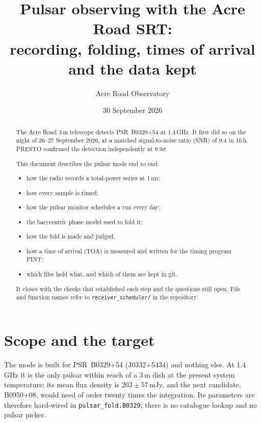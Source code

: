 \documentclass[11pt,a4paper]{article}
\title{Pulsar observing with the Acre Road SRT:\\
recording, folding, times of arrival and the data kept}
\author{Acre Road Observatory}
\date{30 September 2026}
\newcommand{\code}[1]{\texttt{#1}}
\newcommand{\psr}{B0329+54}
\begin{document}
\maketitle

\begin{abstract}
The Acre Road 3\,m telescope detects PSR~\psr{} at 1.4\,GHz. It first did so on the night of 26--27 September 2026, at a matched signal-to-noise ratio (SNR) of 9.4 in 16\,h. PRESTO confirmed the detection independently at $9.9\sigma$.

This document describes the pulsar mode end to end:
\begin{itemize}
\item how the radio records a total-power series at 1\,ms;
\item how every sample is timed;
\item how the pulsar monitor schedules a run every day;
\item the barycentric phase model used to fold it;
\item how the fold is made and judged;
\item how a time of arrival (TOA) is measured and written for the timing program PINT;
\item which files hold what, and which of them are kept in git.
\end{itemize}
It closes with the checks that established each step and the questions still open. File and function names refer to \code{receiver\_scheduler/} in the repository.
\end{abstract}

\tableofcontents
\newpage

\section{Scope and the target}

The mode is built for PSR~\psr{} (J0332+5434) and nothing else. At 1.4\,GHz it is the only pulsar within reach of a 3\,m dish at the present system temperature: its mean flux density is $203\pm57$\,mJy, and the next candidate, B0950+08, would need of order twenty times the integration. Its parameters are therefore hard-wired in \code{pulsar\_fold.B0329}; there is no catalogue lookup and no pulsar picker.
\end{document}
